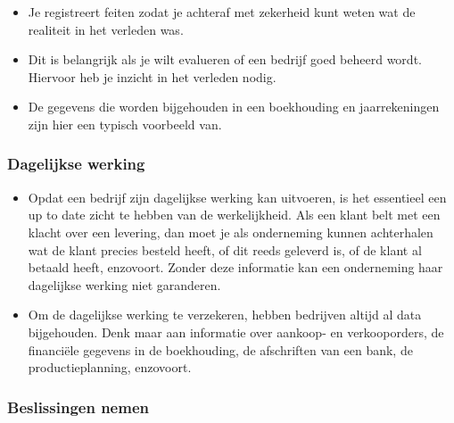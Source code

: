 \documentclass[]{tufte-book}
\providecommand{\tightlist}{%
  \setlength{\itemsep}{0pt}\setlength{\parskip}{0pt}}
\begin{document}
\begin{itemize}
\tightlist
\item
  Je registreert feiten zodat je achteraf met zekerheid kunt weten wat de realiteit in het verleden was.
\item
  Dit is belangrijk als je wilt evalueren of een bedrijf goed beheerd wordt. Hiervoor heb je inzicht in het verleden nodig.
\item
  De gegevens die worden bijgehouden in een boekhouding en jaarrekeningen zijn hier een typisch voorbeeld van.
\end{itemize}

\hypertarget{dagelijkse-werking}{%
\subsubsection*{Dagelijkse werking}\label{dagelijkse-werking}}

\begin{itemize}
\tightlist
\item
  Opdat een bedrijf zijn dagelijkse werking kan uitvoeren, is het essentieel een up to date zicht te hebben van de werkelijkheid. Als een klant belt met een klacht over een levering, dan moet je als onderneming kunnen achterhalen wat de klant precies besteld heeft, of dit reeds geleverd is, of de klant al betaald heeft, enzovoort. Zonder deze informatie kan een onderneming haar dagelijkse werking niet garanderen.
\item
  Om de dagelijkse werking te verzekeren, hebben bedrijven altijd al data bijgehouden. Denk maar aan informatie over aankoop- en verkooporders, de financiële gegevens in de boekhouding, de afschriften van een bank, de productieplanning, enzovoort.
\end{itemize}

\hypertarget{beslissingen-nemen}{%
\subsubsection*{Beslissingen nemen}\label{beslissingen-nemen}}
\end{document}
